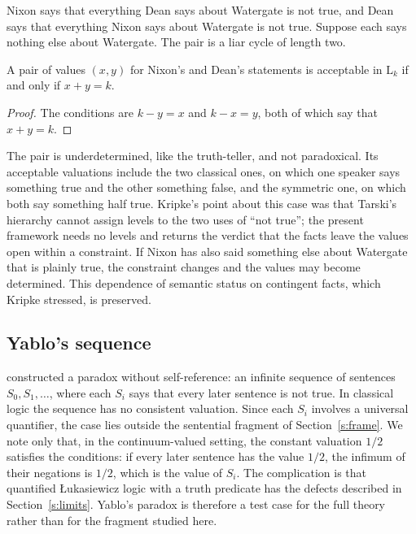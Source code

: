 \documentclass{situationist-preprint}
\begin{document}
Nixon says that everything Dean says about Watergate is not true, and Dean says that everything Nixon says about Watergate is not true. Suppose each says nothing else about Watergate. The pair is a liar cycle of length two.

\begin{proposition}\label{p:nixon}
A pair of values $(x, y)$ for Nixon's and Dean's statements is acceptable in $\mathrm{L}_k$ if and only if $x + y = k$.
\end{proposition}

\begin{proof}
The conditions are $k - y = x$ and $k - x = y$, both of which say that $x + y = k$.
\end{proof}

The pair is underdetermined, like the truth-teller, and not paradoxical. Its acceptable valuations include the two classical ones, on which one speaker says something true and the other something false, and the symmetric one, on which both say something half true. Kripke's point about this case was that Tarski's hierarchy cannot assign levels to the two uses of \enquote{not true}; the present framework needs no levels and returns the verdict that the facts leave the values open within a constraint. If Nixon has also said something else about Watergate that is plainly true, the constraint changes and the values may become determined. This dependence of semantic status on contingent facts, which Kripke stressed, is preserved.

\subsection{Yablo's sequence}

\citet{Yablo1993} constructed a paradox without self-reference: an infinite sequence of sentences $S_0, S_1, \ldots$, where each $S_i$ says that every later sentence is not true. In classical logic the sequence has no consistent valuation. Since each $S_i$ involves a universal quantifier, the case lies outside the sentential fragment of Section~\ref{s:frame}. We note only that, in the continuum-valued setting, the constant valuation $1/2$ satisfies the conditions: if every later sentence has the value $1/2$, the infimum of their negations is $1/2$, which is the value of $S_i$. The complication is that quantified Łukasiewicz logic with a truth predicate has the defects described in Section~\ref{s:limits}. Yablo's paradox is therefore a test case for the full theory rather than for the fragment studied here.
\end{document}
